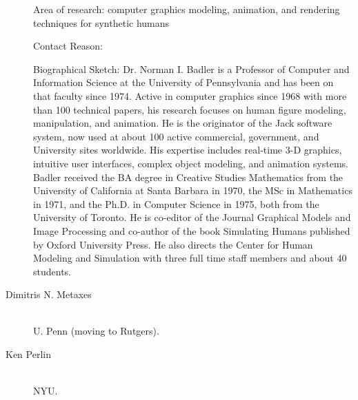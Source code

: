 \documentclass{gtcv}
\begin{document}
\begin{description}
Area of research: computer graphics modeling, animation, and
rendering techniques for synthetic humans

Contact Reason:

\smallskip
Biographical Sketch: Dr. Norman I. Badler is a Professor of
Computer and Information Science at the University of Pennsylvania
and has been on that faculty since 1974. Active in computer
graphics since 1968 with more than 100 technical papers, his
research focuses on human figure modeling, manipulation, and
animation. He is the originator of the Jack software system, now
used at about 100 active commercial, government, and University
sites worldwide. His expertise includes real-time 3-D graphics,
intuitive user interfaces, complex object modeling, and animation
systems. Badler received the BA degree in Creative Studies
Mathematics from the University of California at Santa Barbara in
1970, the MSc in Mathematics in 1971, and the Ph.D. in Computer
Science in 1975, both from the University of Toronto. He is
co-editor of the Journal Graphical Models and Image Processing and
co-author of the book Simulating Humans published by Oxford
University Press. He also directs the Center for Human Modeling
and Simulation with three full time staff members and about 40
students.

\item[Dimitris N. Metaxes]~\\
U. Penn (moving to Rutgers).

\item[Ken Perlin]~\\
NYU.

\end{description}
\end{document}
